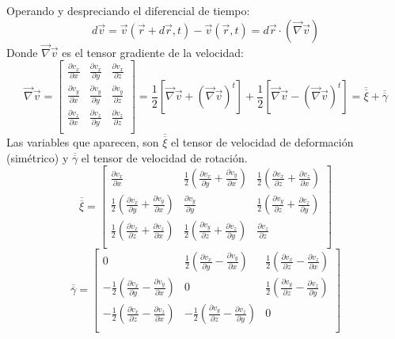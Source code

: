 Operando y despreciando el diferencial de tiempo:
\[d\vec{v}=\vec{v}(\vec{r}+d\vec{r},t)-\vec{v}(\vec r ,t)=d\vec{r}\cdot(\vec{\nabla}\vec{v})\]
Donde $\vec{\nabla}\vec{v}$ es el tensor gradiente de la velocidad:
\setlength{\arraycolsep}{1.5pt}
\renewcommand{\arraystretch}{1.5}
\[\vec{\nabla}\vec{v}=\begin{bmatrix}
	\frac{\partial v_x}{\partial x} & \frac{\partial v_x}{\partial y} & \frac{\partial v_x}{\partial z} \\
	\frac{\partial v_y}{\partial x} & \frac{\partial v_y}{\partial y} & \frac{\partial v_y}{\partial z} \\
	\frac{\partial v_z}{\partial x} & \frac{\partial v_z}{\partial y} & \frac{\partial v_z}{\partial z} \\
\end{bmatrix}=\frac{1}{2}\left[\vec{\nabla}\vec{v}+\left(\vec{\nabla}\vec{v}\right)^t\right]+\frac{1}{2}\left[\vec{\nabla}\vec{v}-\left(\vec{\nabla}\vec{v}\right)^t\right]=\overline{\overline{\xi}}+\overline{\overline{\gamma}}\]
Las variables que aparecen, son $\overline{\overline{\xi}}$ el tensor de velocidad de deformación (simétrico) y $\overline{\overline{\gamma}}$ el tensor de velocidad de rotación.
\setlength{\arraycolsep}{1.5pt}
\renewcommand{\arraystretch}{1.5}
\[\overline{\overline{\xi}}=\begin{bmatrix}
	\frac{\partial v_x}{\partial x} & \frac{1}{2}\left(\frac{\partial v_x}{\partial y}+\frac{\partial v_y}{\partial x}\right) & \frac{1}{2}\left(\frac{\partial v_x}{\partial z}+\frac{\partial v_z}{\partial x}\right) \\
	\frac{1}{2}\left(\frac{\partial v_x}{\partial y}+\frac{\partial v_y}{\partial x}\right) & \frac{\partial v_y}{\partial y} & \frac{1}{2}\left(\frac{\partial v_y}{\partial z} +\frac{\partial v_z}{\partial y}\right) \\
	\frac{1}{2}\left(\frac{\partial v_x}{\partial z}+\frac{\partial v_z}{\partial x}\right) & \frac{1}{2}\left(\frac{\partial v_y}{\partial z} +\frac{\partial v_z}{\partial y}\right) & \frac{\partial v_z}{\partial z} \\
\end{bmatrix}\]
\setlength{\arraycolsep}{1.5pt}
\renewcommand{\arraystretch}{1.5}
\[\overline{\overline{\gamma}}=\begin{bmatrix}
0 & \frac{1}{2}\left(\frac{\partial v_x}{\partial y}-\frac{\partial v_y}{\partial x}\right) & \frac{1}{2}\left(\frac{\partial v_x}{\partial z}-\frac{\partial v_z}{\partial x}\right) \\

	-\frac{1}{2}\left(\frac{\partial v_x}{\partial y}-\frac{\partial v_y}{\partial x}\right) & 0 & \frac{1}{2}\left(\frac{\partial v_y}{\partial z} -\frac{\partial v_z}{\partial y}\right) \\
	
	-\frac{1}{2}\left(\frac{\partial v_x}{\partial z}-\frac{\partial v_z}{\partial x}\right) & -\frac{1}{2}\left(\frac{\partial v_y}{\partial z} -\frac{\partial v_z}{\partial y}\right) & 0 \\
\end{bmatrix}\]
